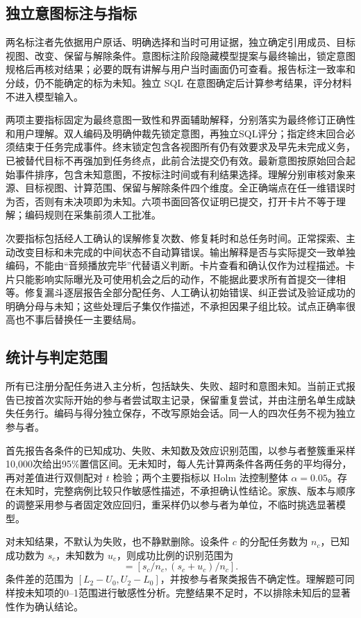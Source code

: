 \documentclass[conference]{IEEEtran}
\begin{document}
\subsection{独立意图标注与指标}
两名标注者先依据用户原话、明确选择和当时可用证据，独立确定引用成员、目标视图、改变、保留与解除条件。意图标注阶段隐藏模型提案与最终输出，锁定意图规格后再核对结果；必要的既有讲解与用户当时画面仍可查看。报告标注一致率和分歧，仍不能确定的标为未知。独立 SQL 在意图确定后计算参考结果，评分材料不进入模型输入。

两项主要指标固定为最终意图一致性和界面辅助解释，分别落实为最终修订正确性和用户理解。双人编码及明确仲裁先锁定意图，再独立SQL评分；指定终末回合必须结束于任务完成事件。终末锁定包含各视图所有仍有效要求及早先未完成义务，已被替代目标不再强加到任务终点，此前合法提交仍有效。最新意图按原始回合起始事件排序，包含未知意图，不按标注时间或有利结果选择。理解分别审核对象来源、目标视图、计算范围、保留与解除条件四个维度。全正确端点在任一维错误时为否，否则有未决项即为未知。六项书面回答仅证明已提交，打开卡片不等于理解；编码规则在采集前须人工批准。

次要指标包括经人工确认的误解修复次数、修复耗时和总任务时间。正常探索、主动改变目标和未完成的中间状态不自动算错误。输出解释是否与实际提交一致单独编码，不能由“音频播放完毕”代替语义判断。卡片查看和确认仅作为过程描述。卡片只能影响实际曝光及可使用机会之后的动作，不能据此要求所有首提交一律相等。修复漏斗逐层报告全部分配任务、人工确认初始错误、纠正尝试及验证成功的明确分母与未知；这些处理后子集仅作描述，不承担因果子组比较。试点正确率很高也不事后替换任一主要结局。

\subsection{统计与判定范围}
所有已注册分配任务进入主分析，包括缺失、失败、超时和意图未知。当前正式报告已按首次实际开始的参与者尝试取主记录，保留重复尝试，并由注册名单生成缺失任务行。编码与得分独立保存，不改写原始会话。同一人的四次任务不视为独立参与者。

首先报告各条件的已知成功、失败、未知数及效应识别范围，以参与者整簇重采样10,000次给出95\%置信区间。无未知时，每人先计算两条件各两任务的平均得分，再对差值进行双侧配对 $t$ 检验；两个主要指标以 Holm 法控制整体 $\alpha=0.05$。存在未知时，完整病例比较只作敏感性描述，不承担确认性结论。家族、版本与顺序的调整采用参与者固定效应回归，重采样仍以参与者为单位，不临时挑选显著模型。

对未知结果，不默认为失败，也不静默删除。设条件 $c$ 的分配任务数为 $n_c$，已知成功数为 $s_c$，未知数为 $u_c$，则成功比例的识别范围为
\begin{equation}
[L_c,U_c]=[s_c/n_c,(s_c+u_c)/n_c].
\end{equation}
条件差的范围为 $[L_2-U_0,U_2-L_0]$，并按参与者聚类报告不确定性。理解题可同样按未知项的0--1范围进行敏感性分析。完整结果不足时，不以排除未知后的显著性作为确认结论。
\end{document}
